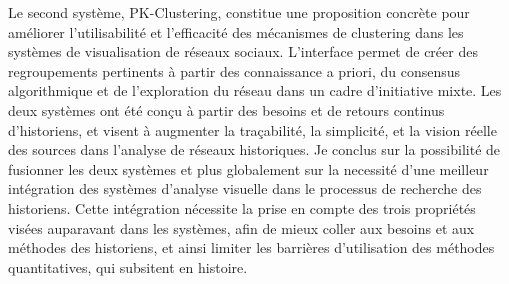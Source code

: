 {%
    Le second système, PK-Clustering, constitue une proposition concrète pour améliorer l'utilisabilité et l'efficacité des mécanismes de clustering dans les systèmes de visualisation de réseaux sociaux.
    L'interface permet de créer des regroupements pertinents à partir des connaissance a priori, du consensus algorithmique et de l'exploration du réseau dans un cadre d'initiative mixte.
    Les deux systèmes ont été conçu à partir des besoins et de retours continus d'historiens, et visent à augmenter la traçabilité, la simplicité, et la vision réelle des sources dans l'analyse de réseaux historiques.
    Je conclus sur la possibilité de fusionner les deux systèmes et plus globalement sur la necessité d'une meilleur intégration des systèmes d'analyse visuelle dans le processus de recherche des historiens.
    Cette intégration nécessite la prise en compte des trois propriétés visées auparavant dans les systèmes, afin de mieux coller aux besoins et aux méthodes des historiens, et ainsi limiter les barrières d'utilisation des méthodes quantitatives, qui subsitent en histoire.
}


